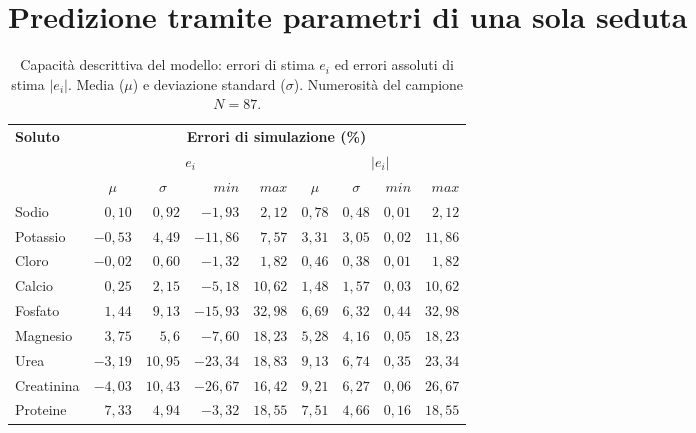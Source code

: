 \documentclass[10pt,twoside]{book}
\begin{document}
 \section{Predizione tramite parametri di una sola seduta}
\begin{table}[htb]
	\centering
	\caption{Capacità descrittiva del modello: errori di stima $e_i$ ed errori assoluti di stima $|e_i|$. Media ($\mu$) e deviazione standard ($\sigma$). Numerosità del campione $N=87$.}\label{tab:descrizione}
	\begin{tabular}{lrrrrrrrr}
	\toprule 
		\textbf{Soluto}   &  \multicolumn{8}{c}{\textbf{Errori di simulazione (\%)}}  \\
		\cmidrule(lr){2-9}
				              &        \multicolumn{4}{c}{$e_i$}             &       \multicolumn{4}{c}{$|e_i|$}             \\
		                  & \multicolumn{1}{c}{$\mu$}      & \multicolumn{1}{c}{$\sigma$}   & $min$   & $max$   & \multicolumn{1}{c}{$\mu$}     & \multicolumn{1}{c}{$\sigma$}   & $min$   & $max$  \\
    \cmidrule(lr){2-5}\cmidrule(lr){6-9}
  	Sodio             & $ 0,10$     & $ 0,92$    & $ -1,93$  & $2,12$  & $0,78$   & $0,48$     & $0,01$ & $ 2,12$   \\
  	Potassio          & $-0,53$     & $ 4,49$    & $-11,86$  & $7,57$  & $3,31$   & $3,05$     & $0,02$ & $11,86$  \\
  	Cloro             & $-0,02$     & $ 0,60$    & $ -1,32$  & $1,82$  & $0,46$   & $0,38$     & $0,01$ & $ 1,82$   \\
  	Calcio            & $ 0,25$     & $ 2,15$    & $ -5,18$  & $10,62$ & $1,48$   & $1,57$     & $0,03$ & $10,62$  \\
  	Fosfato           & $ 1,44$     & $ 9,13$    & $-15,93$  & $32,98$ & $6,69$   & $6,32$     & $0,44$ & $32,98$  \\
  	Magnesio          & $ 3,75$     & $ 5,6 $    & $ -7,60$  & $18,23$ & $5,28$   & $4,16$     & $0,05$ & $18,23$  \\
  	Urea              & $-3,19$     & $10,95$    & $-23,34$  & $18,83$ & $9,13$   & $6,74$     & $0,35$ & $23,34$  \\
  	Creatinina        & $-4,03$     & $10,43$    & $-26,67$  & $16,42$ & $9,21$   & $6,27$     & $0,06$ & $26,67$  \\
  	Proteine          & $ 7,33$     & $ 4,94$    & $ -3,32$  & $18,55$ & $7,51$   & $4,66$     & $0,16$ & $18,55$  \\
  \bottomrule
\end{tabular}
\end{table}
\end{document}
